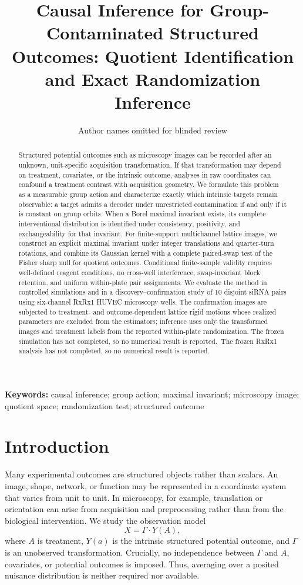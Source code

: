 \documentclass[11pt]{article}
\title{Causal Inference for Group-Contaminated Structured Outcomes:
Quotient Identification and Exact Randomization Inference}
\author{Author names omitted for blinded review}
\date{}
\theoremstyle{definition}
\theoremstyle{remark}
\newcommand{\1}{\mathbf 1}
\providecommand{\RxSelectedPairs}{10}
\providecommand{\AbstractSimulationResult}{The frozen simulation has not completed, so no numerical result is reported.}
\providecommand{\AbstractRxResult}{The frozen RxRx1 analysis has not completed, so no numerical result is reported.}
\begin{document}
\maketitle

\begin{abstract}
Structured potential outcomes such as microscopy images can be recorded after an
unknown, unit-specific acquisition transformation.  If that transformation may
depend on treatment, covariates, or the intrinsic outcome, analyses in raw
coordinates can confound a treatment contrast with acquisition geometry.  We
formulate this problem as a measurable group action and characterize exactly
which intrinsic targets remain observable: a target admits a decoder under
unrestricted contamination if and only if it is constant on group orbits.  When
a Borel maximal invariant exists, its complete interventional distribution is
identified under consistency, positivity, and exchangeability for that
invariant.  For finite-support multichannel lattice images, we construct an
explicit maximal invariant under integer translations and quarter-turn
rotations, and combine its Gaussian kernel with a complete paired-swap test of
the Fisher sharp null for quotient outcomes.  Conditional finite-sample
validity requires well-defined reagent conditions, no cross-well interference,
swap-invariant block retention, and uniform within-plate pair assignments.  We evaluate the
method in controlled simulations and in a discovery--confirmation study of
\(\RxSelectedPairs\) disjoint siRNA pairs using six-channel RxRx1 HUVEC
microscopy wells.  The confirmation images are subjected to treatment- and
outcome-dependent lattice rigid motions whose realized parameters are excluded
from the estimators; inference uses only the transformed images and treatment
labels from the reported within-plate randomization.
\AbstractSimulationResult\ \AbstractRxResult
\end{abstract}

\noindent\textbf{Keywords:} causal inference; group action; maximal invariant;
microscopy image; quotient space; randomization test; structured outcome

\section{Introduction}

Many experimental outcomes are structured objects rather than scalars.  An
image, shape, network, or function may be represented in a coordinate system
that varies from unit to unit.  In microscopy, for example, translation or
orientation can arise from acquisition and preprocessing rather than from the
biological intervention.  We study the observation model
\begin{equation}\label{eq:observation-model}
  X=\Gamma\cdot Y(A),
\end{equation}
where \(A\) is treatment, \(Y(a)\) is the intrinsic structured potential outcome,
and \(\Gamma\) is an unobserved transformation.  Crucially, no independence
between \(\Gamma\) and \(A\), covariates, or potential outcomes is imposed.
Thus, averaging over a posited nuisance distribution is neither required nor
available.
\end{document}

